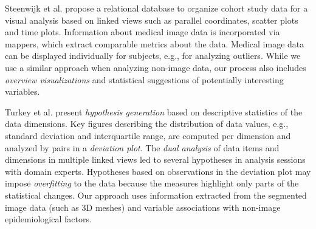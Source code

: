 \documentclass[journal]{style/vgtc} 			          %
\begin{document}
Steenwijk et al. \cite{Steenwijk2010} propose a relational database to organize cohort study data for a visual analysis based on linked views such as parallel coordinates, scatter plots and time plots.
%
Information about medical image data is incorporated via mappers, which extract comparable metrics about the data.
%
Medical image data can be displayed individually for subjects, e.g., for analyzing outliers.
%
While we use a similar approach when analyzing non-image data, our process also includes \emph{overview visualizations} and statistical suggestions of potentially interesting variables.
%

Turkey et al. \cite{Turkay2013} present \emph{hypothesis generation} based on descriptive statistics of the data dimensions.
%
Key figures describing the distribution of data values, e.g., standard deviation and interquartile range, are computed per dimension and analyzed by pairs in a \emph{deviation plot}.
%
%
The \emph{dual analysis} of data items and dimensions in multiple linked views led to several hypotheses in analysis sessions with domain experts.
%
Hypotheses based on observations in the deviation plot may impose \emph{overfitting} to the data because the measures highlight only parts of the statistical changes.
%
Our approach uses information extracted from the segmented image data (such as 3D meshes) and variable associations with non-image epidemiological factors.
\end{document}
